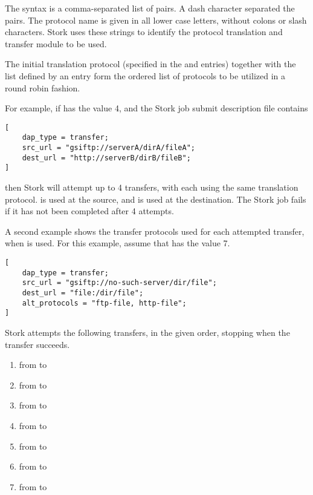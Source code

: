 The syntax is a comma-separated list of pairs.
A dash character separated the pairs.
The protocol name is given in all lower case letters,
without colons or slash characters.
Stork uses these strings to identify the protocol translation
and transfer module to be used. 

The initial translation protocol
(specified in the  and  entries)
together with the list defined by  
an  entry form the ordered list
of protocols to be utilized in a round robin fashion.

For example, if  has the value 4,
and the Stork job submit description file contains
\footnotesize
\begin{verbatim}
[
    dap_type = transfer;
    src_url = "gsiftp://serverA/dirA/fileA";
    dest_url = "http://serverB/dirB/fileB";
]
\end{verbatim}
\normalsize

then Stork will attempt up to 4 transfers,
with each using the same translation protocol.
 is used at the source,
and  is used at the destination.
The Stork job fails if it has not been completed after
4 attempts.

A second example shows the transfer protocols used for
each attempted transfer, 
when  is used.
For this example, assume that 
 has the value 7.
\footnotesize
\begin{verbatim}
[
    dap_type = transfer;
    src_url = "gsiftp://no-such-server/dir/file";
    dest_url = "file:/dir/file";
    alt_protocols = "ftp-file, http-file";
]
\end{verbatim}
\normalsize

Stork attempts the following transfers, in the given order,
stopping when the transfer succeeds.
\begin{enumerate}
    \item from 
            to
    \item from 
            to
    \item from 
            to
    \item from 
            to
    \item from 
            to
    \item from 
            to
    \item from 
            to
 \end{enumerate}

